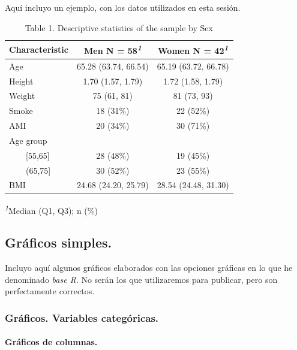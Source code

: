 \documentclass[
  letterpaper,
  DIV=11,
  numbers=noendperiod]{scrreprt}
\let\oldparagraph\paragraph
\renewcommand{\paragraph}[1]{\oldparagraph{#1}\mbox{}}
\begin{document}
Aquí incluyo un ejemplo, con los datos utilizados en esta sesión.

\begin{table}
\caption*{
{\large Table 1. Descriptive statistics of the sample by Sex}
} 
\fontsize{12.0pt}{14.4pt}\selectfont
\begin{tabular*}{\linewidth}{@{\extracolsep{\fill}}lcc}
\toprule
\textbf{Characteristic} & \textbf{Men}  N = 58\textsuperscript{\textit{1}} & \textbf{Women}  N = 42\textsuperscript{\textit{1}} \\ 
\midrule\addlinespace[2.5pt]
Age & 65.28 (63.74, 66.54) & 65.19 (63.72, 66.78) \\ 
Height & 1.70 (1.57, 1.79) & 1.72 (1.58, 1.79) \\ 
Weight & 75 (61, 81) & 81 (73, 93) \\ 
Smoke & 18 (31\%) & 22 (52\%) \\ 
AMI & 20 (34\%) & 30 (71\%) \\ 
Age group &  &  \\ 
    [55,65] & 28 (48\%) & 19 (45\%) \\ 
    (65,75] & 30 (52\%) & 23 (55\%) \\ 
BMI & 24.68 (24.20, 25.79) & 28.54 (24.48, 31.30) \\ 
\bottomrule
\end{tabular*}
\begin{minipage}{\linewidth}
\textsuperscript{\textit{1}}Median (Q1, Q3); n (\%)\\
\end{minipage}
\end{table}

\hypertarget{gruxe1ficos-simples.}{%
\subsection{Gráficos simples.}\label{gruxe1ficos-simples.}}

Incluyo aquí algunos gráficos elaborados con las opciones gráficas en lo
que he denominado \emph{base R}. No serán los que utilizaremos para
publicar, pero son perfectamente correctos.

\hypertarget{gruxe1ficos.-variables-categuxf3ricas.}{%
\subsubsection{Gráficos. Variables
categóricas.}\label{gruxe1ficos.-variables-categuxf3ricas.}}

\hypertarget{gruxe1ficos-de-columnas.}{%
\paragraph{Gráficos de columnas.}\label{gruxe1ficos-de-columnas.}}
\end{document}
